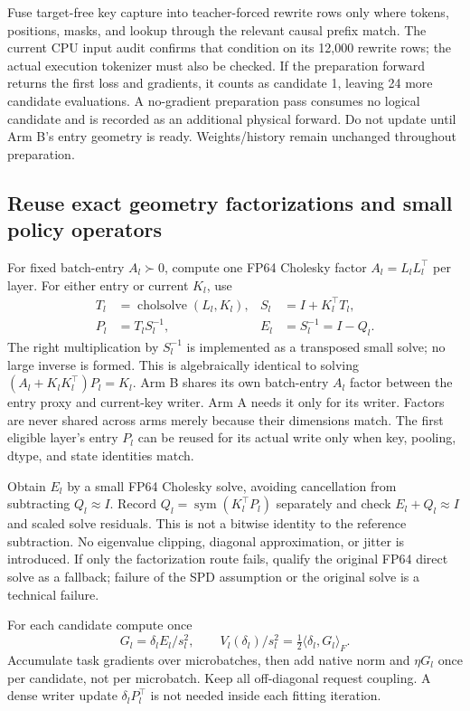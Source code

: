 \documentclass[11pt]{article}
\newcommand{\sym}{\operatorname{sym}}
\begin{document}
Fuse target-free key capture into teacher-forced rewrite rows only where
tokens, positions, masks, and lookup through the relevant causal prefix
match. The current CPU input audit confirms that condition on its 12,000
rewrite rows; the actual execution tokenizer must also be checked.
If the preparation forward returns the first loss and gradients, it counts
as candidate 1, leaving 24 more candidate evaluations. A no-gradient
preparation pass consumes no logical candidate and is recorded as an
additional physical forward. Do not update until Arm B's entry geometry is
ready. Weights/history remain unchanged throughout preparation.

\subsection{Reuse exact geometry factorizations and small policy operators}

For fixed batch-entry $A_l\succ0$, compute one FP64 Cholesky factor
$A_l=L_lL_l^\top$ per layer. For either entry or current $K_l$, use
\begin{align}
 T_l&=\operatorname{cholsolve}(L_l,K_l),&
 S_l&=I+K_l^\top T_l,\\
 P_l&=T_lS_l^{-1},& E_l&=S_l^{-1}=I-Q_l.
 \label{eq:woodbury}
\end{align}
The right multiplication by $S_l^{-1}$ is implemented as a transposed
small solve; no large inverse is formed. This is algebraically identical
to solving $(A_l+K_lK_l^\top)P_l=K_l$. Arm B shares its own batch-entry
$A_l$ factor between the entry proxy and current-key writer. Arm A needs
it only for its writer. Factors are never shared across arms merely
because their dimensions match. The first eligible layer's entry $P_l$
can be reused for its actual write only when key, pooling, dtype, and
state identities match.

Obtain $E_l$ by a small FP64 Cholesky solve, avoiding cancellation from
subtracting $Q_l\approx I$. Record $Q_l=\sym(K_l^\top P_l)$ separately and
check $E_l+Q_l\approx I$ and scaled solve residuals. This is not a bitwise
identity to the reference subtraction. No eigenvalue clipping, diagonal
approximation, or jitter is introduced. If only the factorization route
fails, qualify the original FP64 direct solve as a fallback; failure of the
SPD assumption or the original solve is a technical failure.

For each candidate compute once
\[
 G_l=\delta_lE_l/s_l^2,\qquad V_l(\delta_l)/s_l^2
                 =\tfrac12\langle\delta_l,G_l\rangle_F.
\]
Accumulate task gradients over microbatches, then add native norm and
$\eta G_l$ once per candidate, not per microbatch. Keep all off-diagonal
request coupling. A dense writer update $\delta_lP_l^\top$ is not needed
inside each fitting iteration.
\end{document}
